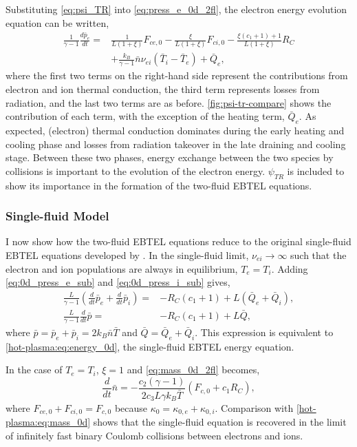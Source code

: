 Substituting \autoref{eq:psi_TR} into \autoref{eq:press_e_0d_2fl}, the electron energy evolution equation can be written,
\begin{align}
    \frac{1}{\gamma -1}\frac{d\bar{p}_e}{dt} =& \frac{1}{L(1+\xi)}F_{ce,0} - \frac{\xi}{L(1+\xi)}F_{ci,0} - \frac{\xi(c_1+1) + 1}{L(1+\xi)}R_C \label{eq:press_e_0d_2fl_breakdown}\\
    &+ \frac{k_B}{\gamma-1}\bar{n}\nu_{ei}(\bar{T}_i-\bar{T}_e) + \bar{Q}_e, \nonumber
\end{align}
where the first two terms on the right-hand side represent the contributions from electron and ion thermal conduction, the third term represents losses from radiation, and the last two terms are as before. \autoref{fig:psi-tr-compare} shows the contribution of each term, with the exception of the heating term, $\bar{Q}_e$. As expected, (electron) thermal conduction dominates during the early heating and cooling phase and losses from radiation takeover in the late draining and cooling stage. Between these two phases, energy exchange between the two species by collisions is important to the evolution of the electron energy. $\psi_{TR}$ is included to show its importance in the formation of the two-fluid EBTEL equations.

\subsubsection{Single-fluid Model}\label{sec:ebtel-single-fluid}

I now show how the two-fluid EBTEL equations reduce to the original single-fluid EBTEL equations developed by \citet{klimchuk_highly_2008,cargill_enthalpy-based_2012}. In the single-fluid limit, $\nu_{ei}\to\infty$ such that the electron and ion populations are always in equilibrium, $T_e=T_i$. Adding \autoref{eq:0d_press_e_sub} and \autoref{eq:0d_press_i_sub} gives,
\begin{align}
    \frac{L}{\gamma - 1}\left(\frac{d}{dt}\bar{p}_e + \frac{d}{dt}\bar{p}_i\right) =& -R_C(c_1 + 1) + L(\bar{Q}_e + \bar{Q}_i), \nonumber\\
    \frac{L}{\gamma - 1}\frac{d}{dt}\bar{p} =& -R_C(c_1 + 1) + L\bar{Q},\nonumber
\end{align}
where $\bar{p}=\bar{p}_e+\bar{p}_i=2k_B\bar{n}\bar{T}$ and $\bar{Q}=\bar{Q}_e+\bar{Q}_i$. This expression is equivalent to \autoref{hot-plasma:eq:energy_0d}, the single-fluid EBTEL energy equation.

In the case of $T_e=T_i$, $\xi=1$ and \autoref{eq:mass_0d_2fl} becomes,
\begin{equation*}
\frac{d}{dt}\bar{n} = -\frac{c_2(\gamma - 1)}{2c_3L\gamma k_B\bar{T}}(F_{c,0} + c_1R_C),
\end{equation*}
where $F_{ce,0} + F_{ci,0}=F_{c,0}$ because $\kappa_0 = \kappa_{0,e} + \kappa_{0,i}$. Comparison with \autoref{hot-plasma:eq:mass_0d} shows that the single-fluid equation is recovered in the limit of infinitely fast binary Coulomb collisions between electrons and ions.

